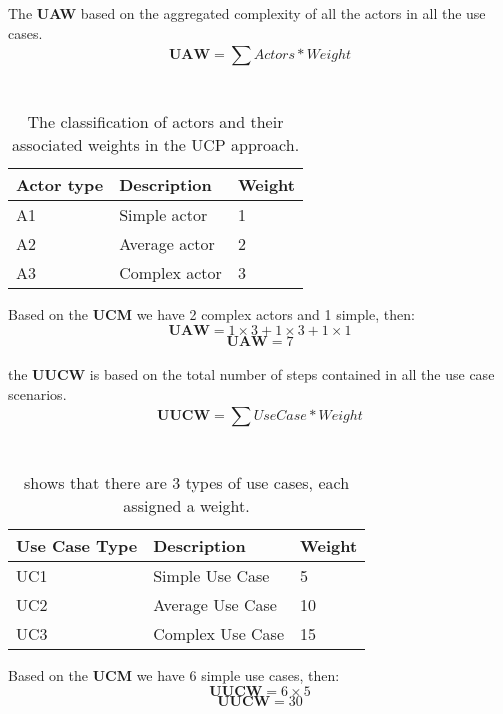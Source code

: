 \documentclass[12pt]{article}
\begin{document}
The \textbf{UAW} based on the aggregated complexity of all the actors in all the use cases.
\begin{equation}
    \textbf{UAW} = \sum^{}_{}{Actors * Weight}
\end{equation}\\
\begin{table}[h]
\centering
\begin{tabular}{|l|l|l|}
\hline
\textbf{Actor type} & \textbf{Description} & \textbf{Weight} \\ \hline
A1                  & Simple actor         & 1               \\ \hline
A2                  & Average actor        & 2               \\ \hline
A3                  & Complex actor        & 3               \\ \hline
\end{tabular}
\caption{The classification of actors and their associated weights in the UCP approach.}
\end{table}
Based on the \textbf{UCM} we have 2 complex actors and 1 simple, then:
\begin{equation}
    \textbf{UAW} = 1\times3 + 1\times3 + 1\times1
\end{equation}
\begin{equation}
    \textbf{UAW} = 7
\end{equation}\\

the \textbf{UUCW} is based on the total number of steps contained in all the use case scenarios.
\begin{equation}
    \textbf{UUCW} = \sum^{}_{}{UseCase * Weight}
\end{equation}\\
\begin{table}[h]
\centering
\begin{tabular}{|l|l|l|}
\hline
\textbf{Use Case Type} & \textbf{Description} & \textbf{Weight} \\ \hline
UC1                    & Simple Use Case      & 5               \\ \hline
UC2                    & Average Use Case     & 10              \\ \hline
UC3                    & Complex Use Case     & 15              \\ \hline
\end{tabular}
\caption{shows that there are 3 types of use cases, each assigned a weight. }
\end{table}
Based on the \textbf{UCM} we have 6 simple use cases, then:
\begin{equation}
    \textbf{UUCW} = 6 \times 5
\end{equation}
\begin{equation}
    \textbf{UUCW} = 30
\end{equation}\\
\end{document}
